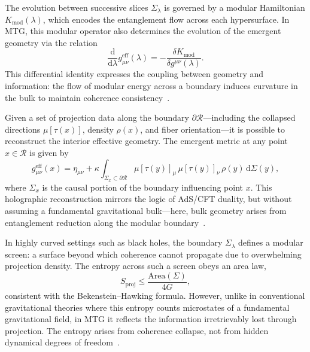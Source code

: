 \documentclass[11pt]{article}
\begin{document}
The evolution between successive slices \( \Sigma_\lambda \) is governed by a modular Hamiltonian \( K_{\mathrm{mod}}(\lambda) \), which encodes the entanglement flow across each hypersurface. In MTG, this modular operator also determines the evolution of the emergent geometry via the relation
\begin{equation}
\frac{\mathrm{d}}{\mathrm{d}\lambda} g^{\mathrm{eff}}_{\mu\nu}(\lambda) = -\frac{\delta K_{\mathrm{mod}}}{\delta g^{\mu\nu}(\lambda)}.
\end{equation}
This differential identity expresses the coupling between geometry and information: the flow of modular energy across a boundary induces curvature in the bulk to maintain coherence consistency~\cite{blanco2013relative, pastawski2015holographic}.

Given a set of projection data along the boundary \( \partial \mathcal{R} \)—including the collapsed directions \( \mu[\tau(x)] \), density \( \rho(x) \), and fiber orientation—it is possible to reconstruct the interior effective geometry. The emergent metric at any point \( x \in \mathcal{R} \) is given by
\begin{equation}
g^{\mathrm{eff}}_{\mu\nu}(x) = \eta_{\mu\nu} + \kappa \int_{\Sigma_x \subset \partial \mathcal{R}} \mu[\tau(y)]_\mu \, \mu[\tau(y)]_\nu \, \rho(y) \, \mathrm{d}\Sigma(y),
\end{equation}
where \( \Sigma_x \) is the causal portion of the boundary influencing point \( x \). This holographic reconstruction mirrors the logic of AdS/CFT duality, but without assuming a fundamental gravitational bulk—here, bulk geometry arises from entanglement reduction along the modular boundary~\cite{tomaz2025rqd}.

In highly curved settings such as black holes, the boundary \( \Sigma_\lambda \) defines a modular screen: a surface beyond which coherence cannot propagate due to overwhelming projection density. The entropy across such a screen obeys an area law,
\begin{equation}
S_{\mathrm{proj}} \leq \frac{\mathrm{Area}(\Sigma)}{4G},
\end{equation}
consistent with the Bekenstein--Hawking formula. However, unlike in conventional gravitational theories where this entropy counts microstates of a fundamental gravitational field, in MTG it reflects the information irretrievably lost through projection. The entropy arises from coherence collapse, not from hidden dynamical degrees of freedom~\cite{bakas2024modulartime}.
\end{document}
